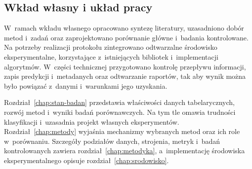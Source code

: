 \subsection{Wkład własny i układ pracy}
\label{sec:wklad}
\label{sec:organizacja}

W~ramach wkładu własnego opracowano syntezę literatury, uzasadniono dobór metod i~zadań oraz zaprojektowano porównanie główne i~badania kontrolowane. Na potrzeby realizacji protokołu zintegrowano odtwarzalne środowisko eksperymentalne, korzystające z~istniejących bibliotek i~implementacji algorytmów. W~części technicznej przygotowano kontrolę przepływu informacji, zapis predykcji i~metadanych oraz odtwarzanie raportów, tak aby wynik można było powiązać z~danymi i~warunkami jego uzyskania.

Rozdział~\ref{chap:stan-badan} przedstawia właściwości danych tabelarycznych, rozwój metod i~wyniki badań porównawczych. Na tym tle omawia trudności klasyfikacji i~uzasadnia projekt własnych eksperymentów. Rozdział~\ref{chap:metody} wyjaśnia mechanizmy wybranych metod oraz ich role w~porównaniu. Szczegóły podziałów danych, strojenia, metryk i~badań kontrolowanych zawiera rozdział~\ref{chap:metodyka}, a~implementację środowiska eksperymentalnego opisuje rozdział~\ref{chap:srodowisko}.
